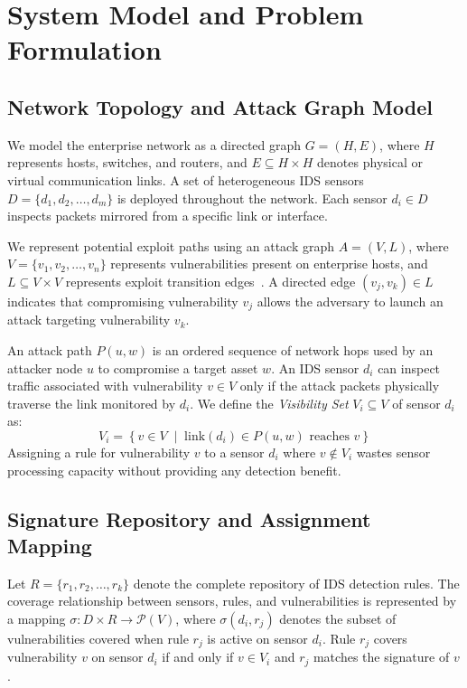 \documentclass[conference]{IEEEtran}
\begin{document}
\section{System Model and Problem Formulation}
\label{sec:model}

\subsection{Network Topology and Attack Graph Model}
We model the enterprise network as a directed graph $G = (H, E)$, where $H$ represents hosts, switches, and routers, and $E \subseteq H \times H$ denotes physical or virtual communication links. A set of heterogeneous IDS sensors $D = \{d_1, d_2, \dots, d_m\}$ is deployed throughout the network. Each sensor $d_i \in D$ inspects packets mirrored from a specific link or interface.

We represent potential exploit paths using an attack graph $A = (V, L)$, where $V = \{v_1, v_2, \dots, v_n\}$ represents vulnerabilities present on enterprise hosts, and $L \subseteq V \times V$ represents exploit transition edges~\cite{jajodia2017integrated}. A directed edge $(v_j, v_k) \in L$ indicates that compromising vulnerability $v_j$ allows the adversary to launch an attack targeting vulnerability $v_k$.

An attack path $P(u, w)$ is an ordered sequence of network hops used by an attacker node $u$ to compromise a target asset $w$. An IDS sensor $d_i$ can inspect traffic associated with vulnerability $v \in V$ only if the attack packets physically traverse the link monitored by $d_i$. We define the \textit{Visibility Set} $V_i \subseteq V$ of sensor $d_i$ as:
\begin{equation}
V_i = \left\{ v \in V \;\middle|\; \text{link}(d_i) \in P(u, w) \text{ reaches } v \right\}
\end{equation}
Assigning a rule for vulnerability $v$ to a sensor $d_i$ where $v \notin V_i$ wastes sensor processing capacity without providing any detection benefit.

\subsection{Signature Repository and Assignment Mapping}
Let $R = \{r_1, r_2, \dots, r_k\}$ denote the complete repository of IDS detection rules. The coverage relationship between sensors, rules, and vulnerabilities is represented by a mapping $\sigma: D \times R \to \mathcal{P}(V)$, where $\sigma(d_i, r_j)$ denotes the subset of vulnerabilities covered when rule $r_j$ is active on sensor $d_i$. Rule $r_j$ covers vulnerability $v$ on sensor $d_i$ if and only if $v \in V_i$ and $r_j$ matches the signature of $v$.
\end{document}
